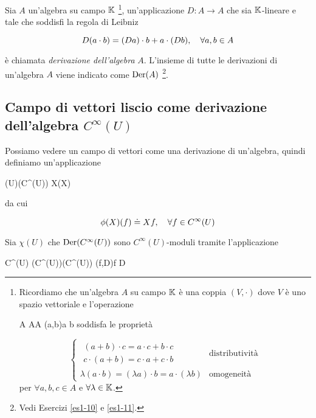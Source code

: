 Sia $ A $ un'algebra su campo $ \mathbb{K} $
	\footnote{%
		Ricordiamo che un'algebra $ A $ su campo $ \mathbb{K} $ è una coppia $ (V, \cdot) $ dove $ V $ è uno spazio vettoriale e l'operazione
		
		\maps{\cdot}
			{A \times A}{A}
			{(a,b)}{a \cdot b}
		soddisfa le proprietà
		
		\begin{equation*}
			\begin{cases}
				\begin{split}
					(a + b) \cdot c = a \cdot c + b \cdot c\\
					c \cdot (a + b) = c \cdot a + c \cdot b
				\end{split} & \text{distributività}\\
				\lambda (a \cdot b) = (\lambda a) \cdot b = a \cdot (\lambda b) & \text{omogeneità}
			\end{cases}
		\end{equation*}
		per $ \forall a,b,c \in A $ e $ \forall \lambda \in \mathbb{K} $.%
}, un'applicazione $ D : A \to A $ che sia $ \mathbb{K} $-lineare e tale che soddisfi la regola di Leibniz

\begin{equation}
	D (a \cdot b) = (D a) \cdot b + a \cdot (D b) \qcomma \forall a, b \in A
\end{equation}

è chiamata \textit{derivazione dell'algebra} $ A $. L'insieme di tutte le derivazioni di un'algebra $ A $ viene indicato come $ \operatorname{Der}(A) $
\footnote{%
	Vedi Esercizi \ref{es1-10} e \ref{es1-11}.%
}.

\subsection{Campo di vettori liscio come derivazione dell'algebra $ C^{\infty}(U) $}

Possiamo vedere un campo di vettori come una derivazione di un'algebra, quindi definiamo un'applicazione

\map{\phi}
	{\chi(U)}{\der(C^{\infty}(U))}
	{X}{\phi(X)}

da cui

\begin{equation}
	\phi(X) (f) \doteq X f \qcomma \forall f \in C^{\infty}(U)
\end{equation}

Sia $ \chi(U) $ che $ \operatorname{Der}(C^{\infty}(U)) $ sono $ C^{\infty}(U) $-moduli tramite l'applicazione

\map{\cdot}
	{C^{\infty}(U) \times \der(C^{\infty}(U))}{\der(C^{\infty}(U))}
	{(f,D)}{f D}

